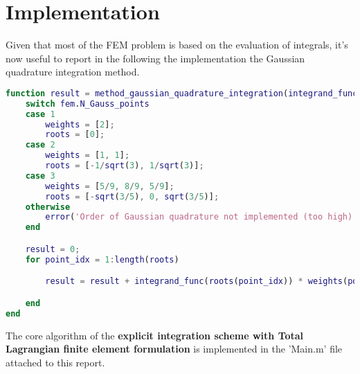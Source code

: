 \section{Implementation}
\label{sec:implementation}

Given that most of the FEM problem is based on the evaluation of integrals, it's now useful to report in the following the implementation the Gaussian quadrature integration method.

\begin{lstlisting}[language=Matlab]
function result = method_gaussian_quadrature_integration(integrand_func, fem)
    switch fem.N_Gauss_points
    case 1
        weights = [2];
        roots = [0];
    case 2
        weights = [1, 1];
        roots = [-1/sqrt(3), 1/sqrt(3)];
    case 3
        weights = [5/9, 8/9, 5/9];
        roots = [-sqrt(3/5), 0, sqrt(3/5)];
    otherwise
        error('Order of Gaussian quadrature not implemented (too high)')
    end

    result = 0;
    for point_idx = 1:length(roots)

        result = result + integrand_func(roots(point_idx)) * weights(point_idx);

    end
end
\end{lstlisting}

The core algorithm of the \textbf{explicit integration scheme with Total Lagrangian finite element formulation} is implemented in the 'Main.m' file attached to this report.